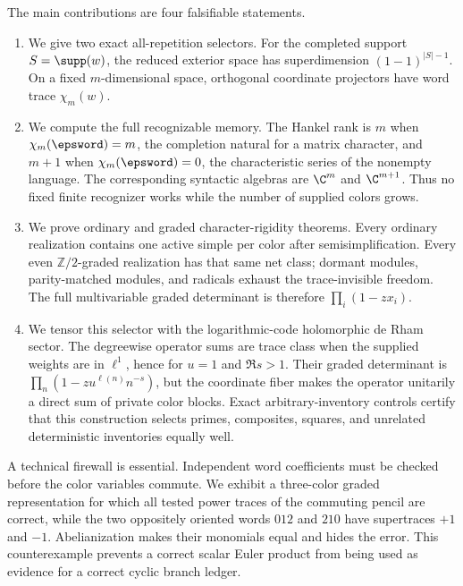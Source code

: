 The main contributions are four falsifiable statements.

\begin{enumerate}
 \item We give two exact all-repetition selectors.  For the completed support
 \(S=\supp(w)\), the reduced exterior space has superdimension
 \((1-1)^{|S|-1}\).  On a fixed \(m\)-dimensional space, orthogonal coordinate
 projectors have word trace \(\chi_m(w)\).

 \item We compute the full recognizable memory.  The Hankel rank is \(m\)
 when \(\chi_m(\epsword)=m\), the completion natural for a matrix character,
 and \(m+1\) when \(\chi_m(\epsword)=0\), the characteristic series of the
 nonempty language.  The corresponding syntactic algebras are
 \(\C^m\) and \(\C^{m+1}\).  Thus no fixed finite recognizer works while the
 number of supplied colors grows.

 \item We prove ordinary and graded character-rigidity theorems.  Every
 ordinary realization contains one active simple per color after
 semisimplification.  Every even \(\mathbb Z/2\)-graded realization has that
 same net class; dormant modules, parity-matched modules, and radicals exhaust
 the trace-invisible freedom.  The full multivariable graded determinant is
 therefore \(\prod_i(1-zx_i)\).

 \item We tensor this selector with the logarithmic-code holomorphic de Rham
 sector.  The degreewise operator sums are trace class when the supplied
 weights are in \(\ell^1\), hence for \(u=1\) and \(\Re s>1\).  Their graded
 determinant is
 \(\prod_n(1-zu^{\ell(n)}n^{-s})\), but the coordinate fiber makes the
 operator unitarily a direct sum of private color blocks.  Exact
 arbitrary-inventory controls certify that this construction selects primes,
 composites, squares, and unrelated deterministic inventories equally well.
\end{enumerate}

A technical firewall is essential.  Independent word coefficients must be
checked before the color variables commute.  We exhibit a three-color graded
representation for which all tested power traces of the commuting pencil are
correct, while the two oppositely oriented words \(012\) and \(210\) have
supertraces \(+1\) and \(-1\).  Abelianization makes their monomials equal and
hides the error.  This counterexample prevents a correct scalar Euler product
from being used as evidence for a correct cyclic branch ledger.

